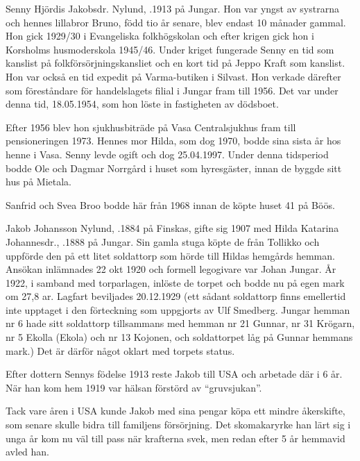 
Senny Hjördis Jakobsdr. Nylund, .1913 på Jungar. Hon var yngst av systrarna och hennes lillabror Bruno, född tio år senare, blev endast 10 månader gammal. Hon gick 1929/30 i Evangeliska folkhögskolan och efter krigen gick hon i Korsholms husmoderskola 1945/46. Under kriget fungerade Senny en tid som kanslist på folkförsörjningskansliet och en kort tid på Jeppo Kraft som kanslist. Hon var också en tid expedit på Varma-butiken i Silvast. Hon verkade därefter som föreståndare för handelslagets filial i Jungar fram till 1956. Det var under denna tid, 18.05.1954, som hon löste in fastigheten av dödsboet.

Efter 1956 blev hon sjukhusbiträde på Vasa Centralsjukhus fram till pensioneringen 1973. Hennes mor Hilda, som dog 1970, bodde sina sista år hos henne i Vasa. Senny levde ogift och  dog  25.04.1997. Under denna tidsperiod bodde Ole och Dagmar Norrgård i huset som hyresgäster, innan de byggde sitt hus på Mietala.

Sanfrid och Svea Broo bodde här från 1968 innan de köpte huset 41 på Böös.


Jakob Johansson Nylund, .1884 på Finskas, gifte sig 1907 med Hilda Katarina Johannesdr., .1888 på Jungar. Sin gamla stuga köpte de från Tollikko och uppförde den på ett litet soldattorp som hörde till Hildas hemgårds hemman. Ansökan inlämnades 22 okt 1920 och formell legogivare var Johan Jungar. År 1922, i samband med torparlagen, inlöste de torpet och bodde nu på egen mark om 27,8 ar. Lagfart beviljades 20.12.1929 (ett sådant soldattorp finns emellertid inte upptaget i den förteckning som uppgjorts av Ulf Smedberg. Jungar hemman nr 6 hade sitt soldattorp tillsammans med hemman nr 21 Gunnar, nr 31 Krögarn, nr 5 Ekolla (Ekola) och nr 13 Kojonen, och soldattorpet  låg på Gunnar hemmans mark.) Det är därför något oklart med torpets status.

Efter dottern Sennys födelse 1913 reste Jakob till USA och arbetade där i 6 år. När han kom hem 1919 var hälsan förstörd av ``gruvsjukan''.

Tack vare åren i USA kunde Jakob med sina pengar köpa ett mindre åkerskifte, som senare skulle bidra till familjens försörjning. Det skomakaryrke han lärt sig i unga år kom nu väl till pass när krafterna svek, men redan efter 5 år hemmavid avled han.

